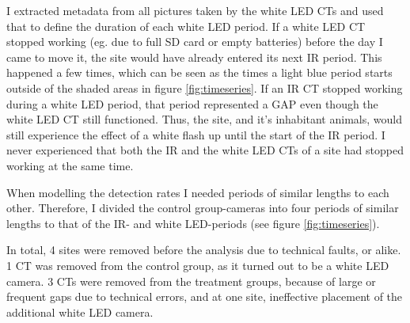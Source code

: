 I extracted metadata from all pictures taken by the white LED CTs and used that to define the duration of each white LED period.
If a white LED CT stopped working (eg. due to full SD card or empty batteries) before the day I came to move it, the site would have already entered its next IR period.
This happened a few times, which can be seen as the times a light blue period starts outside of the shaded areas in figure \ref{fig:timeseries}.
If an IR CT stopped working during a white LED period, that period represented a GAP even though the white LED CT still functioned. Thus, the site, and it's inhabitant animals, would still experience the effect of a white flash up until the start of the IR period.
I never experienced that both the IR and the white LED CTs of a site had stopped working at the same time.

When modelling the detection rates I needed periods of similar lengths to each other. Therefore, I divided the control group-cameras into four periods of similar lengths to that of the IR- and white LED-periods (see figure \ref{fig:timeseries}). 


In total, 4 sites were removed before the analysis due to technical faults, or alike.
1 CT was removed from the control group, as it turned out to be a white LED camera.
3 CTs were removed from the treatment groups, because of large or frequent gaps due to technical errors, and at one site, ineffective placement of the additional white LED camera. 



